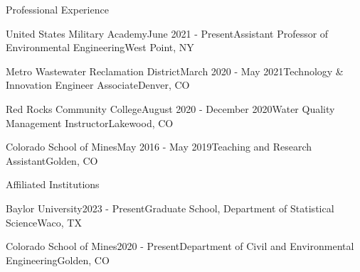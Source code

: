 \documentclass{resume} %
\begin{document}
\begin{rSection}{Professional Experience}

\begin{rSubsection}{United States Military Academy}{June 2021 - Present}{Assistant Professor of Environmental Engineering}{West Point, NY}
\end{rSubsection}


\begin{rSubsection}{Metro Wastewater Reclamation District}{March 2020 - May 2021}{Technology \& Innovation Engineer Associate}{Denver, CO}
\end{rSubsection}


\begin{rSubsection}{Red Rocks Community College}{August 2020 - December 2020}{Water Quality Management Instructor}{Lakewood, CO}
\end{rSubsection}


\begin{rSubsection}{Colorado School of Mines}{May 2016 - May 2019}{Teaching and Research Assistant}{Golden, CO}
\end{rSubsection}

\sectionskip
%

\begin{rSection}{Affiliated Institutions}

\begin{rSubsection}{Baylor University}{2023 - Present}{Graduate School, Department of Statistical Science}{Waco, TX}
\end{rSubsection}

\begin{rSubsection}{Colorado School of Mines}{2020 - Present}{Department of Civil and Environmental Engineering}{Golden, CO}
\end{rSubsection}

\end{rSection}

\sectionskip

\sectionskip


\end{rSection}
\end{document}
